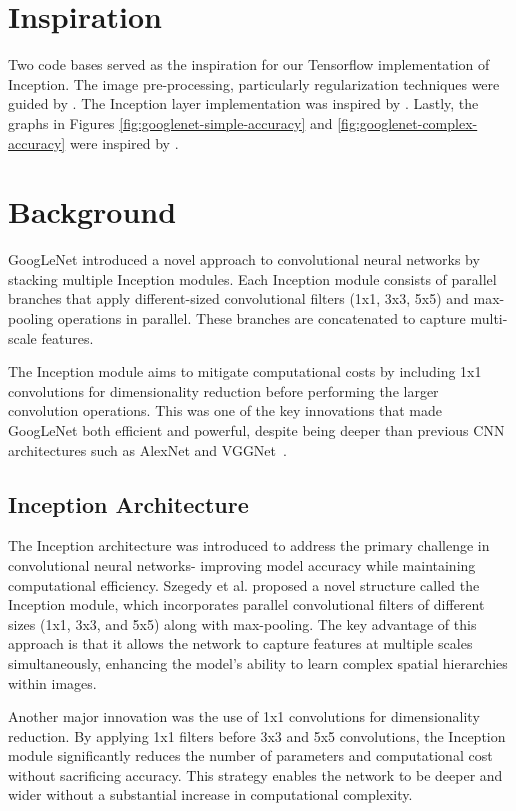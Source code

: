 \documentclass{article}
\begin{document}
\section{Inspiration}
Two code bases served as the inspiration for our Tensorflow implementation of Inception. The image pre-processing, particularly regularization techniques were guided by \cite{dishasai_multiclass_classification}. The Inception layer implementation was inspired by \cite{googlenet_inception_module}. Lastly, the graphs in Figures \ref{fig:googlenet-simple-accuracy} and \ref{fig:googlenet-complex-accuracy} were inspired by \cite{datacamp_cnn_tensorflow}.

\section{Background}

GoogLeNet introduced a novel approach to convolutional neural networks by stacking multiple Inception modules. Each Inception module consists of parallel branches that apply different-sized convolutional filters (1x1, 3x3, 5x5) and max-pooling operations in parallel. These branches are concatenated to capture multi-scale features.

The Inception module aims to mitigate computational costs by including 1x1 convolutions for dimensionality reduction before performing the larger convolution operations. This was one of the key innovations that made GoogLeNet both efficient and powerful, despite being deeper than previous CNN architectures such as AlexNet and VGGNet~\cite{krizhevsky2012imagenet, simonyan2015vgg}.

\subsection{Inception Architecture}
The Inception architecture was introduced to address the primary challenge in convolutional neural networks- improving model accuracy while maintaining computational efficiency. Szegedy et al. proposed a novel structure called the Inception module, which incorporates parallel convolutional filters of different sizes (1x1, 3x3, and 5x5) along with max-pooling. The key advantage of this approach is that it allows the network to capture features at multiple scales simultaneously, enhancing the model's ability to learn complex spatial hierarchies within images.

Another major innovation was the use of 1x1 convolutions for dimensionality reduction. By applying 1x1 filters before 3x3 and 5x5 convolutions, the Inception module significantly reduces the number of parameters and computational cost without sacrificing accuracy. This strategy enables the network to be deeper and wider without a substantial increase in computational complexity.
\end{document}
